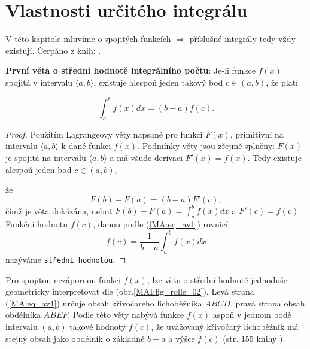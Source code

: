 {\section{Vlastnosti určitého integrálu}
  V této kapitole mluvíme o spojitých funkcích $\Rightarrow$ příslušné integrály tedy vždy
  existují. Čerpáno z knih:
  \cite{Knichal}.

  \begin{lemma}
    \textbf{První věta o střední hodnotě integrálního počtu}: Je-li funkce $f(x)$ spojitá v
    intervalu $\langle a, b\rangle$, existuje alespoň jeden takový bod $c\in(a, b)$, že platí

    \begin{equation}\label{MA:eq_av1}
      \int_a^b f(x)dx = (b-a)f(c).
    \end{equation}
  \end{lemma}

  \begin{proof} Použitím Lagrangeovy věty napsané pro funkci $F(x)$, primitivní na intervalu
    $\langle a, b\rangle$ k dané funkci $f(x)$. Podmínky věty jsou zřejmě splněny: $F(x)$ je
    spojitá na intervalu $\langle a, b\rangle$ a má všude derivaci $F'(x)= f(x)$. Tedy existuje
    alespoň jeden bod $c\in(a, b)$,
    
          
    
      že $$F(b)-F(a) = (b-a)F'(c),$$ čímž je věta dokázána, neboť $F(b)-F(a) = \int_a^bf(x)dx$ a
      $F'(c) = f(c)$. Funkční hodnotu $f(c)$, danou podle (\ref{MA:eq_av1}) rovnicí  
      \begin{equation}\label{MA:eq_av2}
         f(c) = \frac{1}{b-a}\int_a^b f(x)dx
      \end{equation}
      nazýváme \texttt{střední hodnotou}.
  \end{proof}

  Pro spojitou nezápornou funkci $f(x)$, lze větu o střední hodnotě jednoduše geometricky
  interpretovat dle (obr.\ref{MAI:fig_rolle_02}). Levá strana (\ref{MA:eq_av1}) určuje obsah
  křivočarého lichoběžníka $ABCD$, pravá strana obsah obdélníka $ABEF$. Podle této věty nabývá
  funkce $f(x)$ aspoň v jednom bodě intervalu $(a, b)$ takové hodnoty $f(c)$, že uvažovaný
  křivočarý lichoběžník má stejný obsah jako obdélník o základně $b-a$ a výšce $f(c)$ (str. 155
  knihy \cite{Knichal}).

}
